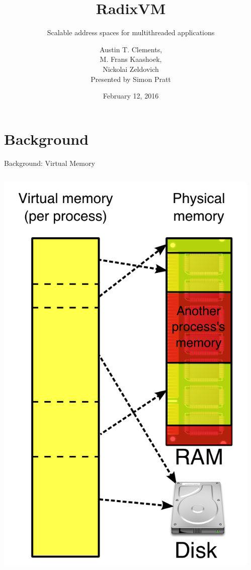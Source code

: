 \documentclass[aspectratio=169]{beamer}
\title{RadixVM}
\subtitle{Scalable address spaces for multithreaded applications}
\author[Presented by Simon Pratt]{Austin T. Clements,\\M. Frans Kaashoek,\\Nickolai Zeldovich\\
  \vspace{2em}Presented by Simon Pratt}
\date{February 12, 2016}
\begin{document}
\frame[plain]{\titlepage}

\newpage

\section{Background}

\begin{frame}{Background: Virtual Memory}
  \begin{columns}[T]
    \begin{column}{0.3\textwidth}
      \includegraphics[scale=0.2]{./figures/Virtual_memory.png}
    \end{column}
    \begin{column}{0.7\textwidth}

\end{column}
\end{columns}
\end{frame}
\end{document}
